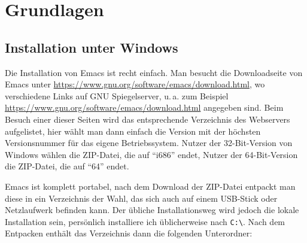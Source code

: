 \documentclass[12pt,ngerman]{scrbook}
\begin{document}
\chapter{Grundlagen}

\section{Installation unter Windows}

Die Installation von Emacs ist recht einfach. Man besucht die Downloadseite von Emacs unter \url{https://www.gnu.org/software/emacs/download.html}, wo verschiedene Links auf GNU Spiegelserver, u.\,a. zum Beispiel \url{https://www.gnu.org/software/emacs/download.html} angegeben sind. 
Beim Besuch einer dieser Seiten wird das entsprechende Verzeichnis des Webservers aufgelistet, hier wählt man dann einfach die Version mit der höchsten Versionsnummer für das eigene Betriebssystem. 
Nutzer der 32-Bit-Version von Windows wählen die ZIP-Datei, die auf \enquote{i686} endet, Nutzer der 64-Bit-Version die ZIP-Datei, die auf \enquote{64} endet.

Emacs ist komplett portabel, nach dem Download der ZIP-Datei entpackt man diese in ein Verzeichnis der Wahl, das sich auch auf einem USB-Stick oder Netzlaufwerk befinden kann.
Der übliche Installationsweg wird jedoch die lokale Installation sein, persönlich installiere ich üblicherweise nach \texttt{C:\textbackslash}. Nach dem Entpacken enthält das Verzeichnis dann die folgenden Unterordner:
\end{document}
